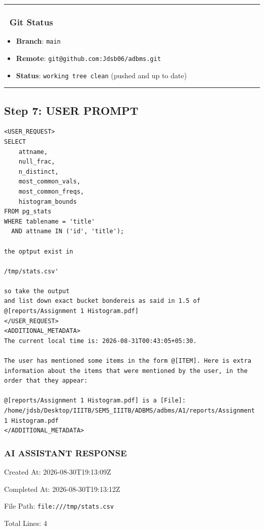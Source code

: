 \documentclass[11pt,a4paper]{article}
\begin{document}
{\hrule


\subsubsection{🐙 Git Status}
\begin{itemize}
\item \textbf{Branch}: \texttt{main}
\item \textbf{Remote}: \texttt{git@github.com:Jdsb06/adbms.git}
\item \textbf{Status}: \texttt{working tree clean} (pushed and up to date)
\end{itemize}

\hrule

\subsection{Step 7: USER PROMPT}

\begin{lstlisting}[language=text]
<USER_REQUEST>
SELECT 
    attname, 
    null_frac, 
    n_distinct, 
    most_common_vals, 
    most_common_freqs, 
    histogram_bounds 
FROM pg_stats
WHERE tablename = 'title' 
  AND attname IN ('id', 'title');

the optput exist in 

/tmp/stats.csv'

so take the output 
and list down exact bucket bondereis as said in 1.5 of  @[reports/Assignment 1 Histogram.pdf] 
</USER_REQUEST>
<ADDITIONAL_METADATA>
The current local time is: 2026-08-31T00:43:05+05:30.

The user has mentioned some items in the form @[ITEM]. Here is extra information about the items that were mentioned by the user, in the order that they appear:

@[reports/Assignment 1 Histogram.pdf] is a [File]:
/home/jdsb/Desktop/IIITB/SEM5_IIITB/ADBMS/adbms/A1/reports/Assignment 1 Histogram.pdf
</ADDITIONAL_METADATA>
\end{lstlisting}


\subsubsection{AI ASSISTANT RESPONSE}

Created At: 2026-08-30T19:13:09Z

Completed At: 2026-08-30T19:13:12Z

File Path: \texttt{file:///tmp/stats.csv}

Total Lines: 4

}
\end{document}
